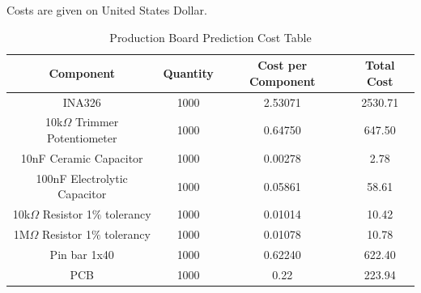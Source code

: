 Costs are given on United States Dollar.\\
\begin{table}[htb]
  \begin{center}
    \ABNTEXreducedfont
    \caption[Production Board Prediction Cost Table]{Production Board Prediction Cost Table}
    \label{Production-cost}
    \begin{tabular}{|c|c|c|c|}
      \hline
    Component & Quantity & Cost per Component & Total Cost \\ \hline
    INA326 & 1000 & 2.53071 & 2530.71\\ \hline
    10k$\Omega$ Trimmer Potentiometer & 1000 & 0.64750 & 647.50 \\ \hline
    10nF Ceramic Capacitor & 1000 & 0.00278 & 2.78 \\ \hline
    100nF Electrolytic Capacitor & 1000 & 0.05861 & 58.61 \\ \hline
    10k$\Omega$ Resistor 1$\%$ tolerancy & 1000 & 0.01014 & 10.42 \\ \hline
    1M$\Omega$ Resistor 1$\%$ tolerancy & 1000 & 0.01078 & 10.78 \\ \hline
    Pin bar 1x40 & 1000 & 0.62240 & 622.40 \\ \hline
    PCB & 1000 & 0.22 & 223.94 \\ \hline
  \end{tabular}
\end{center}
\end{table}
